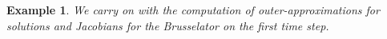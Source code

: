 \documentclass{sig-alternate-05-2015} %
\newcommand\ForAuthors[1]%
 {\par\smallskip                     %
  \begin{center}%
   \fbox%
   {\parbox{0.9\linewidth}%
    {\raggedright\sc--- #1}%
   }%
  \end{center}%
  \par\smallskip                     %
 }
\newtheorem{example}{Example}
\begin{document}
\begin{example}
\label{running2}
We carry on with the computation of outer-approximations for solutions and Jacobians for 
the Brusselator on the first time
step.


\end{example}
\end{document}
